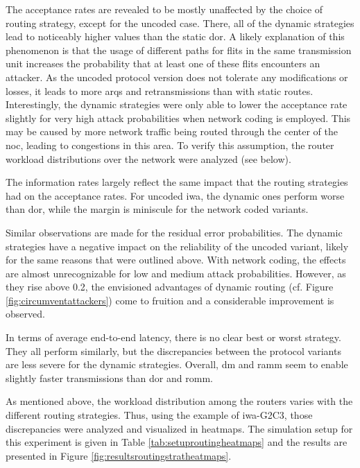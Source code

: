The acceptance rates are revealed to be mostly unaffected by the choice of routing strategy, except for the uncoded case. There, all of the dynamic
strategies lead to noticeably higher values than the static \gls{dor}. A likely explanation of this phenomenon is that the usage of different paths
for flits in the same transmission unit increases the probability that at least one of these flits encounters an attacker. As the uncoded protocol
version does not tolerate any modifications or losses, it leads to more \glspl{arq} and retransmissions than with static routes. Interestingly, the
dynamic strategies were only able to lower the acceptance rate slightly for very high attack probabilities when network coding is employed. This may
be caused by more network traffic being routed through the center of the \gls{noc}, leading to congestions in this area. To verify this assumption,
the router workload distributions over the network were analyzed (see below).

The information rates largely reflect the same impact that the routing strategies had on the acceptance rates. For uncoded \gls{iwa}, the dynamic ones
perform worse than \gls{dor}, while the margin is miniscule for the network coded variants.

Similar observations are made for the residual error probabilities. The dynamic strategies have a negative impact on the reliability of the uncoded
variant, likely for the same reasons that were outlined above. With network coding, the effects are almost unrecognizable for low and medium attack
probabilities. However, as they rise above 0.2, the envisioned advantages of dynamic routing (cf. Figure \ref{fig:circumventattackers}) come to
fruition and a considerable improvement is observed.

In terms of average end-to-end latency, there is no clear best or worst strategy. They all perform similarly, but the discrepancies between the
protocol variants are less severe for the dynamic strategies. Overall, \gls{dm} and \gls{ramm} seem to enable slightly faster transmissions than
\gls{dor} and \gls{romm}.

As mentioned above, the workload distribution among the routers varies with the different routing strategies. Thus, using the example of
\gls{iwa}-G2C3, those discrepancies were analyzed and visualized in heatmaps. The simulation setup for this experiment is given in Table
\vref{tab:setuproutingheatmaps} and the results are presented in Figure \vref{fig:resultsroutingstratheatmaps}.

